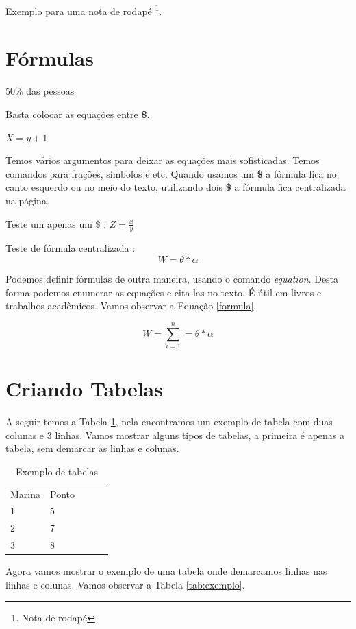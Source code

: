 \documentclass[12pt,a4paper]{article}
\begin{document}
Exemplo para uma nota de rodapé \footnote{Nota de rodapé}.

\section{Fórmulas}

50\% das pessoas

Basta colocar as equações entre \textbf{\$}.

$X = y + 1$
  
  Temos vários argumentos para deixar as equações mais sofisticadas. Temos comandos para frações, símbolos e etc. Quando usamos um \textbf{\$} a fórmula fica no canto esquerdo ou no meio do texto, utilizando dois \textbf{\$} a fórmula fica centralizada na página.

Teste um apenas um \$ : 
  $Z = \frac{x}{y}$
\newline
  
  Teste de fórmula centralizada :
  $$W = \theta * \alpha$$
  
  Podemos definir fórmulas de outra maneira, usando o comando \textit{equation}. Desta forma podemos enumerar as equações e cita-las no texto. É útil em livros e trabalhos acadêmicos. Vamos observar a Equação \ref{formula}.

\begin{equation}
W = \sum_{i=1}^{n} = \theta * \alpha
\label{formula}
\end{equation}

\section{Criando Tabelas}

A seguir temos a Tabela \ref{Tab:Tcr}, nela encontramos um exemplo de tabela com duas colunas e 3 linhas. Vamos mostrar alguns tipos de tabelas, a primeira é apenas a tabela, sem demarcar as linhas e colunas.

\begin{table}
\caption{Exemplo de tabelas}
\begin{tabular}{lllll}
Marina & Ponto &  \\
1      & 5     &  \\
2      & 7     &  \\
3      & 8    
\end{tabular}
\label{Tab:Tcr}
\end{table} 

Agora vamos mostrar o exemplo de uma tabela onde demarcamos linhas nas linhas e colunas. Vamos observar a Tabela \ref{tab:exemplo}.
\end{document}
